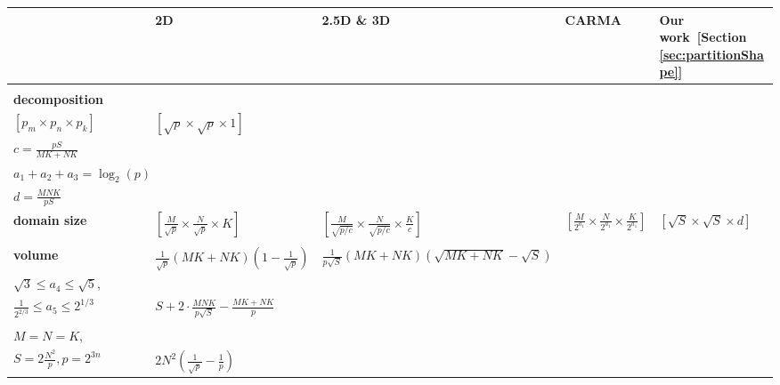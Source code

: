 \documentclass[sigplan,review,anonymous]{acmart}\settopmatter{printfolios=true,printccs=false,printacmref=false}
\begin{document}
\begin{table}
%
\setlength{\tabcolsep}{4pt}
\renewcommand{\arraystretch}{2}
\centering
\scriptsize
\sf
%
\begin{tabular}{lllll}
%
\toprule
%
 & \textbf{2D~\cite{summa}} & \textbf{2.5D \& 3D~\cite{25d}} & \textbf{CARMA~\cite{CARMA}} & \textbf{Our work~[Section \ref{sec:partitionShape}]} \\
%
\midrule
%
\makecell[l]{\textbf{process}\\
\textbf{decomposition} \\
$\left[p_m \times p_n \times p_k\right]$}
&
$\left[\sqrt{p} \times \sqrt{p} \times 1\right]$
&
\makecell[l]{$\left[\sqrt{p/c} \times \sqrt{p/c} \times c\right]$,\\
$c = \frac{pS}{MK + NK}$}
& 
\makecell[l]{$\left[{2^{a_1}} \times {2^{a_2}} \times {2^{a_3}}\right]$,\\
$a_1 + a_2 + a_3 = \log_2(p)$}
& 
\makecell[l]{$\left[\frac{M}{\sqrt{S}} \times \frac{N}{\sqrt{S}} \times \frac{K}{d}\right]$,\\
$d = \frac{MNK}{pS}$}
%
\vspace{1.0em}
%
\\
%
%
\textbf{domain size}
&
$\left[\frac{M}{\sqrt{p}} \times \frac{N}{\sqrt{p}} \times K\right]$ 
&
$\left[\frac{M}{\sqrt{p/c}} \times \frac{N}{\sqrt{p/c}} \times \frac{K}{c}\right]$
&
$\left[\frac{M}{2^{a_1}} \times \frac{N}{2^{a_1}} \times \frac{K}{2^{a_1}}\right]$
& 
$\left[{\sqrt{S}} \times {\sqrt{S}} \times {d}\right]$
%
\vspace{0.5em}
%
\\
%
\midrule
%
\makecell[l]{\textbf{communication}\\
\textbf{volume}}
&
$\frac{1}{\sqrt{p}} \left(MK + NK\right)\left(1 - \frac{1}{\sqrt{p}}\right)$
&
$\frac{1}{p \sqrt{S}} \left(MK + NK\right)\left(\sqrt{MK + NK} - \sqrt{S}\right)$
&
\makecell[l]{$2a_4 \cdot \frac{MNK}{p\sqrt{S}} + a_5 \cdot \left(\frac{MNK}{P}\right)^{2/3} - \frac{MK + NK}{p}$, \\
$\sqrt{3}\le a_4 \le \sqrt{5}$,\\
$\frac{1}{2^{2/3}} \le a_5 \le 2^{1/3}$}
& 
$S + 2 \cdot \frac{MNK}{p\sqrt{S}} - \frac{MK + NK}{p}$
%
\vspace{0.5em}
%
\\
%
\midrule
%
\makecell[l]{\textbf{``the easiest case'':}\\
$M = N = K$,\\
$S = 2\frac{N^2}{p}, p=2^{3n}$}
&
$2N^2 \left(\frac{1}{\sqrt{p}} - \frac{1}{p} \right)$

\end{tabular}
\end{table}
\end{document}
